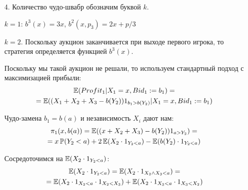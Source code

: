 \begin{enumerate}

\item[4.] Количество чудо-швабр обозначим буквой $k$. 

$ k=1 $: $ b^{3}(x)=3x $, $ b^{2}(x,p_{3})=2x+p/3$

$ k=2 $. Поскольку аукцион заканчивается при выходе первого игрока, то стратегия определяется функцией $ b^{3}(x)$.

Поскольку мы такой аукцион не решали, то используем стандартный подход с максимизацией прибыли:
\begin{multline}
\operatorname{\mathbb{E}}(Profit_{1}|X_{1}=x,Bid_{1}:=b_{1})=\\
=\operatorname{\mathbb{E}}((X_{1}+X_{2}+X_{3}-b(Y_{2}))1_{b_{1}>b(Y_{2})}|X_{1}=x,Bid_{1}:=b_{1})
\end{multline}

Чудо-замена $b_{1}=b(a)$ и независимость $ X_{i} $ дают нам:
\begin{multline}
\pi_{1}(x,b(a))=\operatorname{\mathbb{E}}((x+X_{2}+X_{3})-b(Y_{2}))1_{a>Y_{2}})=\\
=x\operatorname{\mathbb{P}}(Y_{2}<a)+2\operatorname{\mathbb{E}}(X_{2}\cdot 1_{Y_{2}<a})-\operatorname{\mathbb{E}}(b(Y_{2})\cdot 1_{Y_{2}<a})
\end{multline}

Сосредоточимся на $\operatorname{\mathbb{E}}(X_{2}\cdot 1_{Y_{2}<a}) $:
\begin{multline}
\operatorname{\mathbb{E}}(X_{2}\cdot 1_{Y_{2}<a})=\operatorname{\mathbb{E}}(X_{2}\cdot 1_{X_{2}\wedge X_{3}<a})=\\
=\operatorname{\mathbb{E}}(X_{2}\cdot 1_{X_{2}<a}\cdot 1_{X_{2}<X_{3}})+\operatorname{\mathbb{E}}(X_{2}\cdot 1_{X_{3}<a}\cdot 1_{X_{3}<X_{2}})
\end{multline}


\end{enumerate}
